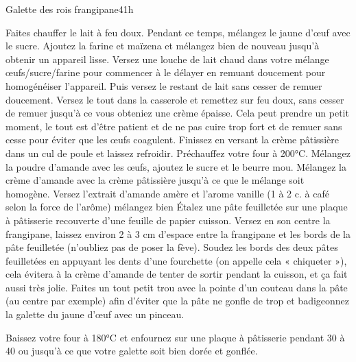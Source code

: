 {\begin{recette}{Galette des rois frangipane}{4}{}{1h}
\begin{preparation}
\etape Faites chauffer le lait à feu doux.
\etape Pendant ce temps, mélangez le jaune d’œuf avec le sucre. Ajoutez la farine et maïzena et mélangez bien de nouveau jusqu’à obtenir un appareil lisse.
\etape Versez une louche de lait chaud dans votre mélange œufs/sucre/farine pour commencer à le délayer en remuant doucement pour homogénéiser l’appareil.
\etape Puis versez le restant de lait sans cesser de remuer doucement.
\etape Versez le tout dans la casserole et remettez sur feu doux, sans cesser de remuer jusqu’à ce vous obteniez une crème épaisse. Cela peut prendre un petit moment, le tout est d’être patient et de ne pas cuire trop fort et de remuer sans cesse pour éviter que les œufs coagulent.
\etape Finissez en versant la crème pâtissière dans un cul de poule et laissez refroidir.
\etape Préchauffez votre four à 200°C.
\etape Mélangez la poudre d’amande avec les œufs, ajoutez le sucre et le beurre mou.
\etape Mélangez la crème d’amande avec la crème pâtissière jusqu’à ce que le mélange soit homogène.
\etape Versez l’extrait d’amande amère et l’arome vanille (1 à 2 c. à café selon la force de l’arôme) mélangez bien
\etape Étalez une pâte feuilletée sur une plaque à pâtisserie recouverte d’une feuille de papier cuisson. Versez en son centre la frangipane, laissez environ 2 à 3 cm d’espace entre la frangipane et les bords de la pâte feuilletée (n’oubliez pas de poser la fève).
\etape Soudez les bords des deux pâtes feuilletées en appuyant les dents d’une fourchette (on appelle cela « chiqueter »), cela évitera à la crème d’amande de tenter de sortir pendant la cuisson, et ça fait aussi très jolie.
\etape Faites un tout petit trou avec la pointe d’un couteau dans la pâte (au centre par exemple) afin d’éviter que la pâte ne gonfle de trop et badigeonnez la galette du jaune d’œuf avec un pinceau.

\end{preparation}

\begin{cuisson}
Baissez votre four à 180°C et enfournez sur une plaque à pâtisserie pendant 30 à 40 ou jusqu’à ce que votre galette soit bien dorée et gonflée.
\end{cuisson}
\end{recette}

}

